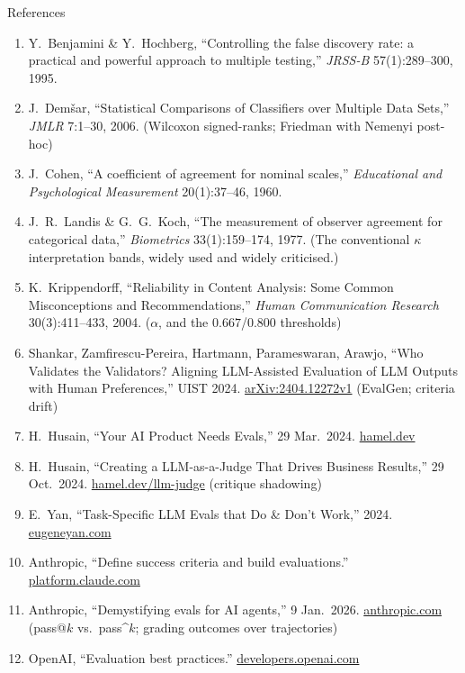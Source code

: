 \begin{frame}[allowframebreaks]{References}
\begin{enumerate}
    \item Y.~Benjamini \& Y.~Hochberg, ``Controlling the false discovery rate: a practical and powerful approach to multiple testing,'' \textit{JRSS-B} 57(1):289--300, 1995.
    \item J.~Dem\v{s}ar, ``Statistical Comparisons of Classifiers over Multiple Data Sets,'' \textit{JMLR} 7:1--30, 2006. (Wilcoxon signed-ranks; Friedman with Nemenyi post-hoc)
    \item J.~Cohen, ``A coefficient of agreement for nominal scales,'' \textit{Educational and Psychological Measurement} 20(1):37--46, 1960.
    \item J.~R.~Landis \& G.~G.~Koch, ``The measurement of observer agreement for categorical data,'' \textit{Biometrics} 33(1):159--174, 1977. (The conventional $\kappa$ interpretation bands, widely used and widely criticised.)
    \item K.~Krippendorff, ``Reliability in Content Analysis: Some Common Misconceptions and Recommendations,'' \textit{Human Communication Research} 30(3):411--433, 2004. ($\alpha$, and the $0.667$/$0.800$ thresholds)
    \item Shankar, Zamfirescu-Pereira, Hartmann, Parameswaran, Arawjo, ``Who Validates the Validators? Aligning LLM-Assisted Evaluation of LLM Outputs with Human Preferences,'' UIST 2024. \href{https://arxiv.org/abs/2404.12272v1}{arXiv:2404.12272v1} (EvalGen; criteria drift)
    \item H.~Husain, ``Your AI Product Needs Evals,'' 29 Mar.\ 2024. \href{https://hamel.dev/blog/posts/evals/}{hamel.dev}
    \item H.~Husain, ``Creating a LLM-as-a-Judge That Drives Business Results,'' 29 Oct.\ 2024. \href{https://hamel.dev/blog/posts/llm-judge/}{hamel.dev/llm-judge} (critique shadowing)
    \item E.~Yan, ``Task-Specific LLM Evals that Do \& Don't Work,'' 2024. \href{https://eugeneyan.com/writing/evals/}{eugeneyan.com}
    \item Anthropic, ``Define success criteria and build evaluations.'' \href{https://platform.claude.com/docs/en/test-and-evaluate/develop-tests}{platform.claude.com}
    \item Anthropic, ``Demystifying evals for AI agents,'' 9 Jan.\ 2026. \href{https://www.anthropic.com/engineering/demystifying-evals-for-ai-agents}{anthropic.com} (pass@$k$ vs.\ pass\textasciicircum$k$; grading outcomes over trajectories)
    \item OpenAI, ``Evaluation best practices.'' \href{https://developers.openai.com/api/docs/guides/evaluation-best-practices}{developers.openai.com}
  \end{enumerate}
\end{frame}
